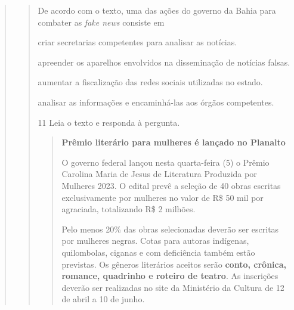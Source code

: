 \begin{escolha}
\begin{escolha}
\begin{escolha}
\begin{quote}
\begin{quote}
De acordo com o texto, uma das ações do governo da Bahia para combater
as \textit{fake news} consiste em

\begin{escolha}

  \item criar secretarias competentes para analisar as notícias.

  \item apreender os aparelhos envolvidos na disseminação de notícias
falsas.

  \item aumentar a fiscalização das redes sociais utilizadas no estado.

  \item analisar as informações e encaminhá-las aos órgãos competentes.
\end{escolha}


\num{11} Leia o texto e responda à pergunta.

\begin{quote}
\textbf{Prêmio literário para mulheres é lançado no Planalto}

O governo federal lançou nesta quarta-feira (5) o Prêmio Carolina Maria
de Jesus de Literatura Produzida por Mulheres 2023. O edital prevê a
seleção de 40 obras escritas exclusivamente por mulheres no valor de R\$
50 mil por agraciada, totalizando R\$ 2 milhões.

Pelo menos 20\% das obras selecionadas deverão ser escritas por mulheres
negras. Cotas para autoras indígenas, quilombolas, ciganas e com
deficiência também estão previstas. Os gêneros literários aceitos serão
\textbf{conto, crônica, romance, quadrinho e roteiro de teatro}. As
inscrições deverão ser realizadas no site da Ministério da Cultura de 12
de abril a 10 de junho.
\end{quote}


\end{quote}
\end{quote}
\end{escolha}
\end{escolha}
\end{escolha}
